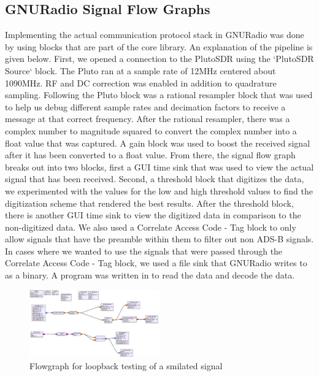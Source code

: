 \documentclass[journal, onecolumn]{IEEEtran}
\begin{document}
\subsection{GNURadio Signal Flow Graphs}
Implementing the actual communication protocol stack in GNURadio was done by using blocks that are part of the core library.
An explanation of the pipeline is given below.
First, we opened a connection to the PlutoSDR using the `PlutoSDR Source` block. 
The Pluto ran at a sample rate of 12MHz centered about 1090MHz.
RF and DC correction was enabled in addition to quadrature sampling.
Following the Pluto block was a rational resampler block that was used to help us debug different sample rates and decimation factors to receive a message at that correct frequency.
After the rational resampler, there was a complex number to magnitude squared to convert the complex number into a float value that was captured.
A gain block was used to boost the received signal after it has been converted to a float value.
From there, the signal flow graph breaks out into two blocks, first a GUI time sink that was used to view the actual signal that has been received.
Second, a threshold block that digitizes the data, we experimented with the values for the low and high threshold values to find the digitization scheme that rendered the best results.
After the threshold block, there is another GUI time sink to view the digitized data in comparison to the non-digitized data.
We also used a Correlate Access Code - Tag block to only allow signals that have the preamble within them to filter out non ADS-B signals.
In cases where we wanted to use the signals that were passed through the Correlate Access Code - Tag block, we used a file sink that GNURadio writes to as a binary.
A program was written in to read the data and decode the data.
\begin{figure}
  \begin{center}
    \includegraphics[width=0.5\textwidth]{./figures/fig_gnuradio_loopback_test.png}
  \end{center}
  \caption{Flowgraph for loopback testing of a smilated signal}\label{fig:loopback_grc}
\end{figure}
\end{document}
